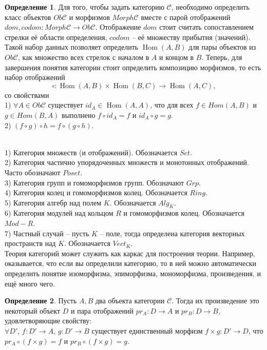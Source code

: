 \documentclass[10pt,a4paper,oneside]{book}
\theoremstyle{definition}
\newtheorem{defn}{Определение}
\newcommand{\mc}[1]{\mathcal{#1}}
\newcommand{\Hom}{\operatorname{Hom}}
\def\dfn{\begin{defn}}
\def\edfn{\end{defn}}
\begin{document}
\dfn Для того, чтобы задать категорию $\mc C$, необходимо определить класс объектов $Ob \mc C$ и морфизмов $Morph \mc C$ вместе с парой отображений $dom, codom \colon Morph \mc C \to Ob \mc C$. Отображение $dom$ стоит считать сопоставлением стрелки её области определения, $codom$ -- её множеству прибытия (значений). Такой набор данных позволяет определить $\Hom (A,B)$ для пары объектов из $Ob \mc C$, как множество всех стрелок с началом в $A$ и концом в $B$. Теперь, для завершения понятия категории стоит определить композицию морфизмов, то есть набор отображений
$$ \circ \colon \Hom(A,B) \times \Hom(B,C) \to \Hom(A,C),$$
со свойствами \\
1) $\forall A \in Ob \mc C $ существует $id_A \in \Hom(A,A)$, что для всех $f \in Hom(A,B)$ и $g \in Hom(B,A)$ выполнено $f\circ id_A=f$ и $id_A \circ g=g$.\\
2) $(f\circ g) \circ h = f \circ (g \circ h)$. 
\edfn 

\\
1) Категория множеств (и отображений). Обозначается $Set$.\\
2) Категория частично упорядоченных множеств и монотонных отображений. Часто обозначают $Poset$.\\
3) Категория групп и гомоморфизмов групп. Обозначают $Grp$.\\
4) Категория колец и гомоморфизмов колец. Обозначается $Ring$.\\
5) Категория алгебр над полем $K$. Обозначается $Alg_K$.\\
6) Категория модулей над кольцом $R$ и гомоморфизмов колец. Обозначается $Mod-R$.\\
7) Частный случай -- пусть $K$ -- поле, тогда определена категория векторных пространств над $K$. Обозначается $Vect_K$.\\

Теория категорий может служить как каркас для построения теории. Например, оказывается, что если вы определили категорию, то в ней можно автоматически определить понятие изоморфизма, эпиморфизма, мономорфизма, произведения, и ещё много чего.
\dfn Пусть $A,B$ два объекта категории $\mc C$. Тогда их произведение это некоторый объект $D$ и пара отображений $pr_A \colon D \to A$ и $pr_B \colon D \to B$, удовлетворяющие свойству:\\
$\forall D'$, $f\colon D' \to A$, $g \colon D' \to B$ существует единственный морфизм $f \times g \colon D' \to D$, что $pr_A \circ (f\times g)=f$ и $pr_B \circ (f\times g)=g$.
\edfn
\end{document}
